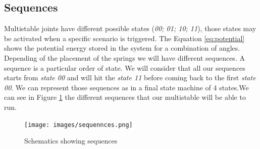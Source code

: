     \subsection{Sequences}\label{sec:sequences}
        Multistable joints have different possible states (\textit{00; 01; 10; 11}), those states may be activated when a specific scenario is triggered. The Equation \ref{eq:potential} shows the potential energy stored in the system for a combination of angles. Depending of the placement of the springs we will have different sequences. A sequence is a particular order of state. We will consider that all our sequences starts from \textit{state 00} and will hit the \textit{state 11} before coming back to the first \textit{state 00}. We can represent those sequences as in a final state machine of 4 states.We can see in Figure \ref{fig:sequences} the different sequences that our multistable will be able to run. 
        
        \begin{figure}
            \centering
            \texttt{[image: images/sequennces.png]}
            \caption{Schematics showing sequences}
            \label{fig:sequences}
        \end{figure}
    